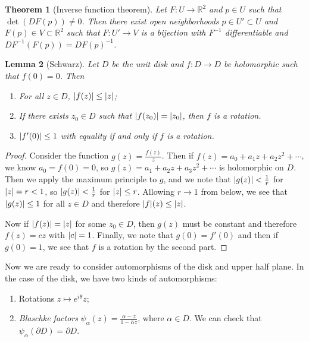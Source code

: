 \documentclass[leqno, openany]{memoir}
\newtheorem{thm}{Theorem}[section]
\newtheorem{lem}[thm]{Lemma}
\theoremstyle{definition}
\theoremstyle{remark}
\theoremstyle{plain}
\theoremstyle{definition}
\theoremstyle{remark}
\newcommand{\R}{\mathbb{R}}
\newcommand{\ol}[1]{\overline{#1}}
\begin{document}
\begin{thm}[Inverse function theorem] Let $F \colon U \to \R^2$ and $p \in U$
    such that $\det (DF(p)) \neq 0$. Then there exist open neighborhoods $p \in
    U' \subset U$ and $F(p) \in V \subset \R^2$ such that $F \colon U' \to V$
    is a bijection with $F^{-1}$ differentiable and $DF^{-1}(F(p)) =
    {DF(p)}^{-1}$.  \end{thm}

\begin{lem}[Schwarz] Let $D$ be the unit disk and $f \colon D \to D$ be
    holomorphic such that $f(0) = 0$. Then \begin{enumerate} \item For all $z
        \in D$, $\abs{f(z)} \leq \abs{z}$; \item If there exists $z_0 \in D$
        such that $\abs{f(z_0)} = \abs{z_0}$, then $f$ is a rotation.  \item
$\abs{f'(0)} \leq 1$ with equality if and only if $f$ is a rotation.
\end{enumerate} \end{lem}

\begin{proof} Consider the function $g(z) = \frac{f(z)}{z}$. Then if $f(z) =
    a_0 + a_1 z + a_2 z^2 + \cdots$, we know $a_0 = f(0) = 0$, so $g(z) = a_1 +
    a_2 z + a_3 z^2 + \cdots$ is holomorphic on $D$. Then we apply the maximum
    principle to $g$, and we note that $\abs{g(z)} < \frac{1}{r}$ for $\abs{z}
    = r < 1$, so $\abs{g(z)} < \frac{1}{r}$ for $\abs{z} \leq r$. Allowing $r
    \to 1$ from below, we see that $\abs{g(z)} \leq 1$ for all $z \in D$ and
    therefore $\abs{f}(z) \leq \abs{z}$.

    Now if $\abs{f(z)} = \abs{z}$ for some $z_0 \in D$, then $g(z)$ must be
constant and therefore $f(z) = cz$ with $\abs{c} = 1$. Finally, we note that
$g(0) = f'(0)$ and then if $g(0) = 1$, we see that $f$ is a rotation by the
second part.  \end{proof}

Now we are ready to consider automorphisms of the disk and upper half plane. In
the case of the disk, we have two kinds of automorphisms: \begin{enumerate}
    \item Rotations $z \mapsto e^{i\theta}z$; \item \textit{Blaschke factors}
        $\psi_{\alpha}(z) = \frac{\alpha - z}{1 - \ol{\alpha}z}$, where $\alpha
        \in D$. We can check that $\psi_{\alpha}(\partial D) = \partial D$.
\end{enumerate}
\end{document}
